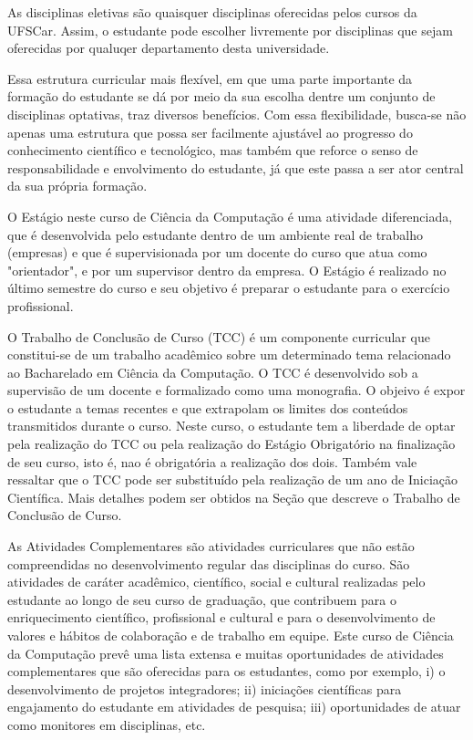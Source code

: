 As disciplinas eletivas são quaisquer disciplinas oferecidas pelos cursos da UFSCar. Assim, o estudante pode escolher livremente por disciplinas que sejam oferecidas por qualuqer departamento desta universidade.

Essa estrutura curricular mais flexível, em que uma parte importante da formação do estudante se dá por meio  da sua escolha dentre um conjunto de disciplinas optativas, traz diversos benefícios. Com essa flexibilidade, busca-se não apenas uma estrutura que possa ser facilmente ajustável ao progresso do conhecimento científico e tecnológico, mas também que reforce o senso de responsabilidade e envolvimento do estudante, já que este passa a ser ator central da sua própria formação.

O Estágio neste curso de Ciência da Computação é uma atividade diferenciada, que é desenvolvida pelo estudante dentro de um ambiente real de trabalho (empresas) e que é supervisionada por um docente do curso que atua como "orientador", e por um supervisor dentro da empresa. O Estágio é realizado no último semestre do curso e seu objetivo é preparar o estudante para o exercício profissional.

O Trabalho de Conclusão de Curso (TCC) é um componente curricular que constitui-se de um trabalho acadêmico sobre um determinado tema relacionado ao Bacharelado em Ciência da Computação. O TCC é desenvolvido sob a supervisão de um docente e formalizado como uma monografia. O objeivo é expor o estudante a temas recentes e que extrapolam os limites dos conteúdos transmitidos durante o curso. Neste curso, o estudante tem a liberdade de optar pela realização do TCC ou pela realização do Estágio Obrigatório na finalização de seu curso, isto é, nao é obrigatória a realização dos dois. Também vale ressaltar que o TCC pode ser substituído pela realização de um ano de Iniciação Científica. Mais detalhes podem ser obtidos na Seção que descreve o Trabalho de Conclusão de Curso. 

As Atividades Complementares são atividades curriculares que não estão compreendidas no desenvolvimento regular das disciplinas do curso. São atividades de caráter acadêmico, científico, social e cultural realizadas pelo estudante ao longo de seu curso de graduação, que contribuem para o enriquecimento científico, profissional e cultural e para o desenvolvimento de valores e hábitos de colaboração e de trabalho em equipe. Este curso de Ciência da Computação prevê uma lista extensa e muitas oportunidades de atividades complementares que são oferecidas para os estudantes, como por exemplo, i) o desenvolvimento de projetos integradores; ii) iniciações científicas para engajamento do estudante em atividades de pesquisa; iii) oportunidades de atuar como monitores em disciplinas, etc. 

